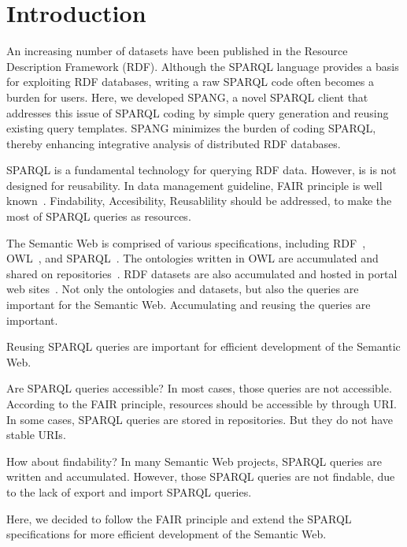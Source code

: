\documentclass[runningheads]{llncs}
\begin{document}
\section{Introduction}
An increasing number of datasets have been published in the Resource Description Framework (RDF). 
Although the SPARQL language provides a basis for exploiting RDF databases, writing a raw SPARQL code often becomes a burden for users. 
Here, we developed SPANG, a novel SPARQL client
that addresses this issue of SPARQL coding by simple query generation and reusing existing query templates.
SPANG
minimizes the burden of coding SPARQL,
thereby enhancing integrative analysis of distributed RDF databases. 


SPARQL is a fundamental technology for querying RDF data. However, is is not designed for reusability. In data management guideline, FAIR principle is well known~\cite{fair}. Findability, Accesibility, Reusablility should be addressed, to make the most of SPARQL queries as resources. 

The Semantic Web is comprised of various specifications, including RDF~\cite{rdf}, OWL~\cite{owl}, and SPARQL~\cite{sparql}. The ontologies written in OWL are accumulated and shared on repositories~\cite{bioportal}.
RDF datasets are also accumulated and hosted in portal web sites~\cite{rdf-portal}.
Not only the ontologies and datasets, but also the queries are important for the Semantic Web.
Accumulating and reusing the queries are important.

Reusing SPARQL queries are important for efficient development of the Semantic Web. 

Are SPARQL queries accessible? In most cases, those queries are not accessible. According to the FAIR principle, resources should be accessible by through URI. In some cases, SPARQL queries are stored in repositories. But they do not have stable URIs.

How about findability? In many Semantic Web projects, SPARQL queries are written and accumulated. However, those SPARQL queries are not findable, due to the lack of export and import SPARQL queries.

Here, we decided to follow the FAIR principle and extend the SPARQL specifications for more efficient development of the Semantic Web.
\end{document}
